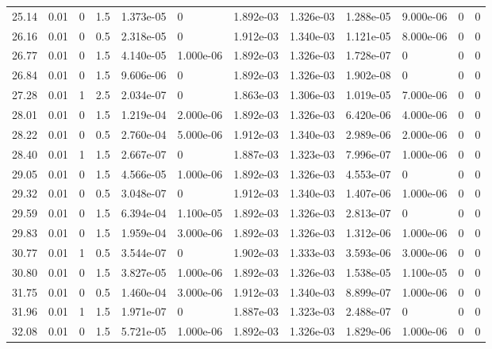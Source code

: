 \documentclass[preview]{standalone}
\begin{document}
{{{\begin{tabular}{L{1.2cm}C{1.2cm} C{0.3cm}C{0.5cm} C{1.4cm}C{1.4cm} C{1.4cm}C{1.4cm} C{1.6cm}C{1.6cm} C{1.6cm}C{1.6cm}}
  25.14  &  0.01  & 0     & 1.5 &  1.373e-05  & 0  &  1.892e-03&   1.326e-03& 1.288e-05 & 9.000e-06   &  0 & 0  \\ 
  26.16  &  0.01  & 0     & 0.5 &  2.318e-05  & 0  &  1.912e-03&   1.340e-03& 1.121e-05 & 8.000e-06   &  0 & 0  \\ 
  26.77  &  0.01  & 0     & 1.5 &  4.140e-05  & 1.000e-06  &  1.892e-03&   1.326e-03& 1.728e-07 & 0   &  0 & 0  \\ 
  26.84  &  0.01  & 0     & 1.5 &  9.606e-06  & 0  &  1.892e-03&   1.326e-03& 1.902e-08 & 0   &  0 & 0  \\ 
  27.28  &  0.01  & 1     & 2.5 &  2.034e-07  & 0  &  1.863e-03&   1.306e-03& 1.019e-05 & 7.000e-06   &  0 & 0  \\ 
  28.01  &  0.01  & 0     & 1.5 &  1.219e-04  & 2.000e-06  &  1.892e-03&   1.326e-03& 6.420e-06 & 4.000e-06   &  0 & 0  \\ 
  28.22  &  0.01  & 0     & 0.5 &  2.760e-04  & 5.000e-06  &  1.912e-03&   1.340e-03& 2.989e-06 & 2.000e-06   &  0 & 0  \\ 
  28.40  &  0.01  & 1     & 1.5 &  2.667e-07  & 0  &  1.887e-03&   1.323e-03& 7.996e-07 & 1.000e-06   &  0 & 0  \\ 
  29.05  &  0.01  & 0     & 1.5 &  4.566e-05  & 1.000e-06  &  1.892e-03&   1.326e-03& 4.553e-07 & 0   &  0 & 0  \\ 
  29.32  &  0.01  & 0     & 0.5 &  3.048e-07  & 0  &  1.912e-03&   1.340e-03& 1.407e-06 & 1.000e-06   &  0 & 0  \\ 
  29.59  &  0.01  & 0     & 1.5 &  6.394e-04  & 1.100e-05  &  1.892e-03&   1.326e-03& 2.813e-07 & 0   &  0 & 0  \\ 
  29.83  &  0.01  & 0     & 1.5 &  1.959e-04  & 3.000e-06  &  1.892e-03&   1.326e-03& 1.312e-06 & 1.000e-06   &  0 & 0  \\ 
  30.77  &  0.01  & 1     & 0.5 &  3.544e-07  & 0  &  1.902e-03&   1.333e-03& 3.593e-06 & 3.000e-06   &  0 & 0  \\ 
  30.80  &  0.01  & 0     & 1.5 &  3.827e-05  & 1.000e-06  &  1.892e-03&   1.326e-03& 1.538e-05 & 1.100e-05   &  0 & 0  \\ 
  31.75  &  0.01  & 0     & 0.5 &  1.460e-04  & 3.000e-06  &  1.912e-03&   1.340e-03& 8.899e-07 & 1.000e-06   &  0 & 0  \\ 
  31.96  &  0.01  & 1     & 1.5 &  1.971e-07  & 0  &  1.887e-03&   1.323e-03& 2.488e-07 & 0   &  0 & 0  \\ 
  32.08  &  0.01  & 0     & 1.5 &  5.721e-05  & 1.000e-06  &  1.892e-03&   1.326e-03& 1.829e-06 & 1.000e-06   &  0 & 0  \\ 

\end{tabular}}}}
\end{document}
